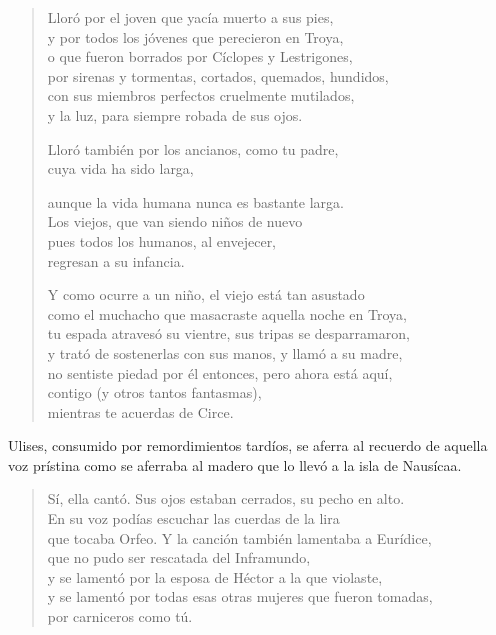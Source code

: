 \documentclass[11pt,a4paper]{article}
\begin{document}
\begin{verse}
Lloró por el joven que yacía muerto a sus pies,\\
y por todos los jóvenes que perecieron en Troya,\\
o que fueron borrados por Cíclopes y Lestrigones,\\
por sirenas y tormentas, cortados, quemados, hundidos,\\
con sus miembros perfectos cruelmente mutilados,\\
y la luz, para siempre robada de sus ojos.

Lloró también por los ancianos, como tu padre,\\
cuya vida ha sido larga,

aunque la vida humana nunca es bastante larga.\\
Los viejos, que van siendo niños de nuevo\\
pues todos los humanos, al envejecer,\\
regresan a su infancia.

Y como ocurre a un niño, el viejo está tan asustado\\
como el muchacho que masacraste aquella noche en Troya,\\
tu espada atravesó su vientre, sus tripas se desparramaron,\\
y trató de sostenerlas con sus manos, y llamó a su madre,\\
no sentiste piedad por él entonces, pero ahora está aquí,\\
contigo (y otros tantos fantasmas),\\
mientras te acuerdas de Circe.
\end{verse}

Ulises, consumido por remordimientos tardíos, se aferra al recuerdo de aquella voz prístina como se aferraba al madero que lo llevó a la isla de Nausícaa.

\begin{verse}
Sí, ella cantó. Sus ojos estaban cerrados, su pecho en alto.\\
En su voz podías escuchar las cuerdas de la lira\\
que tocaba Orfeo. Y la canción también lamentaba a Eurídice,\\
que no pudo ser rescatada del Inframundo,\\
y se lamentó por la esposa de Héctor a la que violaste,\\
y se lamentó por todas esas otras mujeres que fueron tomadas,\\
por carniceros como tú.
\end{verse}
\end{document}
